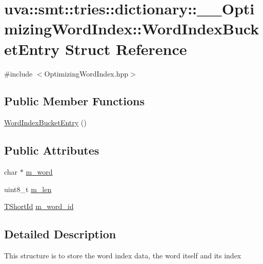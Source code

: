 \hypertarget{structuva_1_1smt_1_1tries_1_1dictionary_1_1_____optimizing_word_index_1_1_word_index_bucket_entry}{}\section{uva\+:\+:smt\+:\+:tries\+:\+:dictionary\+:\+:\+\_\+\+\_\+\+Optimizing\+Word\+Index\+:\+:Word\+Index\+Bucket\+Entry Struct Reference}
\label{structuva_1_1smt_1_1tries_1_1dictionary_1_1_____optimizing_word_index_1_1_word_index_bucket_entry}


{\ttfamily \#include $<$Optimizing\+Word\+Index.\+hpp$>$}

\subsection*{Public Member Functions}
\begin{DoxyCompactItemize}
\item 
\hyperlink{structuva_1_1smt_1_1tries_1_1dictionary_1_1_____optimizing_word_index_1_1_word_index_bucket_entry_ae7a0e872b07d99e0ee03bd6f977e5911}{Word\+Index\+Bucket\+Entry} ()
\end{DoxyCompactItemize}
\subsection*{Public Attributes}
\begin{DoxyCompactItemize}
\item 
char $\ast$ \hyperlink{structuva_1_1smt_1_1tries_1_1dictionary_1_1_____optimizing_word_index_1_1_word_index_bucket_entry_a06876be3c5fcc6f5330ee9b1c2ac3b68}{m\+\_\+word}
\item 
uint8\+\_\+t \hyperlink{structuva_1_1smt_1_1tries_1_1dictionary_1_1_____optimizing_word_index_1_1_word_index_bucket_entry_a7456cc27788d452e912cef793f628cc9}{m\+\_\+len}
\item 
\hyperlink{namespaceuva_1_1smt_1_1hashing_adcf22e1982ad09d3a63494c006267469}{T\+Short\+Id} \hyperlink{structuva_1_1smt_1_1tries_1_1dictionary_1_1_____optimizing_word_index_1_1_word_index_bucket_entry_aeb0232a62ec2e44988b8ab87cac016fc}{m\+\_\+word\+\_\+id}
\end{DoxyCompactItemize}


\subsection{Detailed Description}
This structure is to store the word index data, the word itself and its index 

